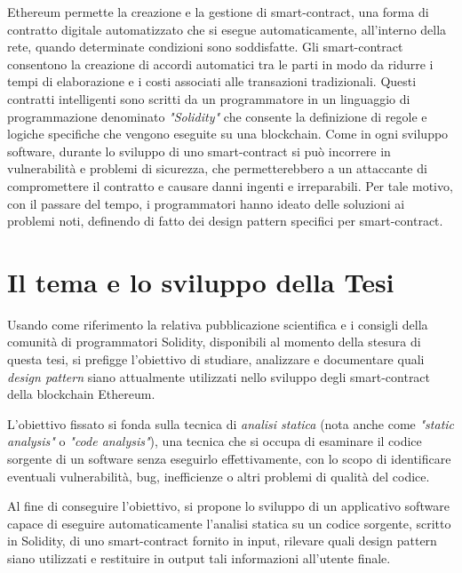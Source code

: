 Ethereum permette la creazione e la gestione di smart-contract, una forma di contratto digitale automatizzato che si esegue automaticamente, all'interno della rete, quando determinate condizioni sono soddisfatte. Gli smart-contract consentono la creazione di accordi automatici tra le parti in modo da ridurre i tempi di elaborazione e i costi associati alle transazioni tradizionali. Questi contratti intelligenti sono scritti da un programmatore in un linguaggio di programmazione denominato \textit{"Solidity"}\cite{solidity} che consente la definizione di regole e logiche specifiche che vengono eseguite su una blockchain. Come in ogni sviluppo software, durante lo sviluppo di uno smart-contract si può incorrere in vulnerabilità e problemi di sicurezza, che permetterebbero a un attaccante di compromettere il contratto e causare danni ingenti e irreparabili. Per tale motivo, con il passare del tempo, i programmatori hanno ideato delle soluzioni ai problemi noti, definendo di fatto dei design pattern specifici per smart-contract.

\section{Il tema e lo sviluppo della Tesi}
Usando come riferimento la relativa pubblicazione scientifica e i consigli della comunità di programmatori Solidity, disponibili al momento della stesura di questa tesi, si prefigge l'obiettivo di studiare, analizzare e documentare quali \textit{design pattern} siano attualmente utilizzati nello sviluppo degli smart-contract della blockchain Ethereum.

L'obiettivo fissato si fonda sulla tecnica di \textit{analisi statica} (nota anche come \textit{"static analysis"} o \textit{"code analysis"}), una tecnica che si occupa di esaminare il codice sorgente di un software senza eseguirlo effettivamente, con lo scopo di identificare eventuali vulnerabilità, bug, inefficienze o altri problemi di qualità del codice. 

Al fine di conseguire l'obiettivo, si propone lo sviluppo di un applicativo software capace di eseguire automaticamente l'analisi statica su un codice sorgente, scritto in Solidity, di uno smart-contract fornito in input, rilevare quali design pattern siano utilizzati e restituire in output tali informazioni all'utente finale. 


